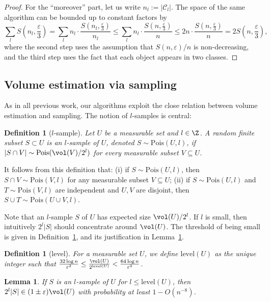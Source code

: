\documentclass[a4paper, 11pt]{article}
\newtheorem{lemma}[theorem]{Lemma}
\newtheorem{definition}[theorem]{Definition}
\newcommand{\Pois}{\mathrm{Pois}}
\newcommand{\level}{\mathrm{level}}
\newcommand{\eps}{\varepsilon}
\newcommand{\class}[1]{\mathcal{#1}}
\begin{document}
\begin{proof}
    For the ``moreover'' part, let us write $n_l := |\class{C}_l|$. The space of the same algorithm can be bounded up to constant factors by
    \[
        \sum_l S \left( n_l, \frac{\eps}{3} \right)
        = \sum_l n_l \cdot \frac{S(n_l, \frac{\eps}{3})}{n_l}
        \leq \sum_l n_l \cdot \frac{S(n, \frac{\eps}{3})}{n}
        \leq 2 n \cdot \frac{S(n, \frac{\eps}{3})}{n}
        = 2 S\left( n, \frac{\eps}{3} \right),
    \]
    where the second step uses the assumption that $S(n,\eps)/n$ is non-decreasing, and the third step uses the fact that each object appears in two classes.
\end{proof}

\subsection{Volume estimation via sampling}
As in all previous work, our algorithms exploit the close relation between volume estimation and sampling. The notion of $l$-samples is central:

\begin{definition}[$l$-sample]
    Let $U$ be a measurable set and $l \in \Z$. A random finite subset $S \subset U$ is an \emph{$l$-sample} of $U$, denoted $S \sim \Pois(U,l)$, if $|S \cap V| \sim \Pois(\vol(V)/2^l)$ for every measurable subset $V \subseteq U$.
\end{definition}

It follows from this definition that: (i) if $S \sim \Pois(U,l)$, then $S \cap V \sim \Pois(V,l)$ for any measurable subset $V \subseteq U$; (ii) if $S \sim \Pois(U,l)$ and $T \sim \Pois(V,l)$ are independent and $U,V$ are disjoint, then $S \cup T \sim \Pois(U \cup V, l)$.

Note that an $l$-sample $S$ of $U$ has expected size $\vol(U)/2^l$.
If $l$ is small, then intuitively $2^l |S|$ should concentrate around $\vol(U)$. The threshold of being small is given in Definition~\ref{def:level}, and its justification in Lemma~\ref{lem:l-sample}.
\begin{definition}[level]
    \label{def:level}
    For a measurable set $U$, we define $\level(U)$ as the unique integer such that $\frac{32 \log n}{\eps^2} \leq \frac{\vol(U)}{2^{\level(U)}} < \frac{64 \log n}{\eps^2}$.
\end{definition}

\begin{lemma}
    \label{lem:l-sample}
    If $S$ is an $l$-sample of $U$ for $l \leq \level(U)$, then $2^l |S| \in (1\pm\eps) \vol(U)$ with probability at least $1 - O(n^{-8})$.
\end{lemma}
\end{document}
